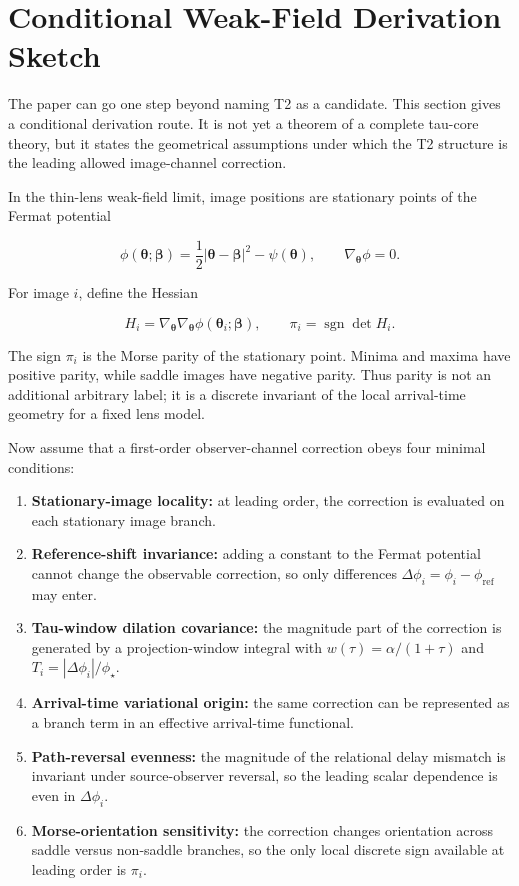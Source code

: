 \documentclass[11pt]{article}
\providecommand{\tightlist}{%
  \setlength{\itemsep}{0pt}\setlength{\parskip}{0pt}}
\begin{document}
\section{Conditional Weak-Field Derivation
Sketch}\label{conditional-weak-field-derivation-sketch}

The paper can go one step beyond naming T2 as a candidate. This section
gives a conditional derivation route. It is not yet a theorem of a
complete tau-core theory, but it states the geometrical assumptions
under which the T2 structure is the leading allowed image-channel
correction.

In the thin-lens weak-field limit, image positions are stationary points
of the Fermat potential

\[
\phi(\boldsymbol{\theta};\boldsymbol{\beta})
=
\frac{1}{2}
|\boldsymbol{\theta}-\boldsymbol{\beta}|^2
- \psi(\boldsymbol{\theta}),
\qquad
\nabla_{\boldsymbol{\theta}}\phi = 0.
\]

For image \(i\), define the Hessian

\[
H_i =
\nabla_{\boldsymbol{\theta}}\nabla_{\boldsymbol{\theta}}
\phi(\boldsymbol{\theta}_i;\boldsymbol{\beta}),
\qquad
\pi_i = \operatorname{sgn}\det H_i.
\]

The sign \(\pi_i\) is the Morse parity of the stationary point. Minima
and maxima have positive parity, while saddle images have negative
parity. Thus parity is not an additional arbitrary label; it is a
discrete invariant of the local arrival-time geometry for a fixed lens
model.

Now assume that a first-order observer-channel correction obeys four
minimal conditions:

\begin{enumerate}
\def\labelenumi{\arabic{enumi}.}
\tightlist
\item
  \textbf{Stationary-image locality:} at leading order, the correction
  is evaluated on each stationary image branch.
\item
  \textbf{Reference-shift invariance:} adding a constant to the Fermat
  potential cannot change the observable correction, so only differences
  \(\Delta\phi_i=\phi_i-\phi_\mathrm{ref}\) may enter.
\item
  \textbf{Tau-window dilation covariance:} the magnitude part of the
  correction is generated by a projection-window integral with
  \(w(\tau)=\alpha/(1+\tau)\) and \(T_i=|\Delta\phi_i|/\phi_\star\).
\item
  \textbf{Arrival-time variational origin:} the same correction can be
  represented as a branch term in an effective arrival-time functional.
\item
  \textbf{Path-reversal evenness:} the magnitude of the relational delay
  mismatch is invariant under source-observer reversal, so the leading
  scalar dependence is even in \(\Delta\phi_i\).
\item
  \textbf{Morse-orientation sensitivity:} the correction changes
  orientation across saddle versus non-saddle branches, so the only
  local discrete sign available at leading order is \(\pi_i\).
\end{enumerate}
\end{document}
